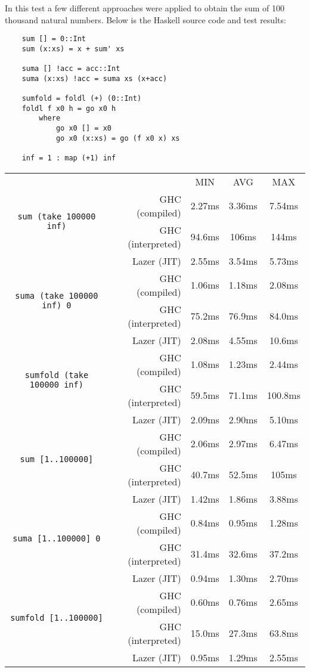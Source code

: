 \documentclass[en]{pracamgr}
\begin{document}
In this test a few different approaches were applied to
obtain the sum of 100 thousand natural numbers.
Below is the Haskell source code and test results:

\begin{verbatim}
    sum [] = 0::Int
    sum (x:xs) = x + sum' xs

    suma [] !acc = acc::Int
    suma (x:xs) !acc = suma xs (x+acc)

    sumfold = foldl (+) (0::Int)
    foldl f x0 h = go x0 h
        where
            go x0 [] = x0
            go x0 (x:xs) = go (f x0 x) xs

    inf = 1 : map (+1) inf
\end{verbatim}

\begin{center}
\begin{tabular}{c r c c c}
    & & MIN & AVG & MAX \\
    \cline{3-5}

    \multirow{2}{*}{\texttt{sum (take 100000 inf)}}
    & GHC (compiled)& 2.27ms & 3.36ms & 7.54ms \\
    & GHC (interpreted)& 94.6ms & 106ms & 144ms \\
    & Lazer (JIT)& 2.55ms & 3.54ms & 5.73ms \\
    \cline{2-5}

    \multirow{2}{*}{\texttt{suma (take 100000 inf) 0}}
    & GHC (compiled)& 1.06ms & 1.18ms & 2.08ms \\
    & GHC (interpreted)& 75.2ms & 76.9ms & 84.0ms \\
    & Lazer (JIT)& 2.08ms & 4.55ms & 10.6ms \\
    \cline{2-5}

    \multirow{2}{*}{\texttt{sumfold (take 100000 inf)}}
    & GHC (compiled)& 1.08ms & 1.23ms & 2.44ms \\
    & GHC (interpreted)& 59.5ms & 71.1ms & 100.8ms \\
    & Lazer (JIT)& 2.09ms & 2.90ms & 5.10ms \\
    \cline{2-5}

    \multirow{2}{*}{\texttt{sum [1..100000]}}
    & GHC (compiled)& 2.06ms & 2.97ms & 6.47ms \\
    & GHC (interpreted)& 40.7ms & 52.5ms & 105ms \\
    & Lazer (JIT)& 1.42ms & 1.86ms & 3.88ms \\
    \cline{2-5}

    \multirow{2}{*}{\texttt{suma [1..100000] 0}}
    & GHC (compiled)& 0.84ms & 0.95ms & 1.28ms \\
    & GHC (interpreted)& 31.4ms & 32.6ms & 37.2ms \\
    & Lazer (JIT)& 0.94ms & 1.30ms & 2.70ms \\
    \cline{2-5}

    \multirow{2}{*}{\texttt{sumfold [1..100000]}}
    & GHC (compiled)& 0.60ms & 0.76ms & 2.65ms \\
    & GHC (interpreted)& 15.0ms & 27.3ms & 63.8ms \\
    & Lazer (JIT)& 0.95ms & 1.29ms & 2.55ms \\
\end{tabular}
\end{center}
\end{document}
